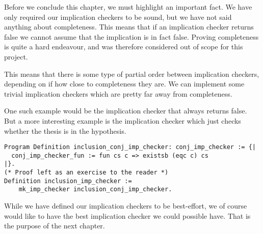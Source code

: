 Before we conclude this chapter, we must highlight an important fact. We have only
required our implication checkers to be sound, but we have not said anything about
completeness. This means that if an implication checker returns false we cannot 
assume that the implication is in fact false. Proving completeness is quite a hard
endeavour, and was therefore considered out of scope for this project.

This means that there is some type of partial order between implication checkers, 
depending on if how close to completeness they are. We can implement some trivial
implication checkers which are pretty far away from completeness. 

One such example would be the implication checker that always returns false. But a
more interesting example is the implication checker which just checks whether the
thesis is in the hypothesis.

\begin{verbatim}
Program Definition inclusion_conj_imp_checker: conj_imp_checker := {| 
  conj_imp_checker_fun := fun cs c => existsb (eqc c) cs
|}.
(* Proof left as an exercise to the reader *)
Definition inclusion_imp_checker := 
    mk_imp_checker inclusion_conj_imp_checker.
\end{verbatim}

While we have defined our implication checkers to be best-effort, we of course would
like to have the best implication checker we could possible have. That is the 
purpose of the next chapter.